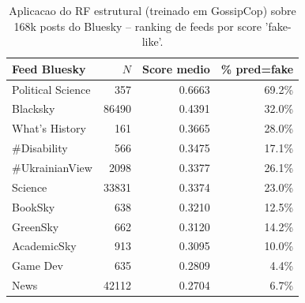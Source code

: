 \begin{table}[H]\centering
\caption{Aplicacao do RF estrutural (treinado em GossipCop) sobre 168k posts do Bluesky -- ranking de feeds por score 'fake-like'.}
\label{tab:bluesky_inferencia_feeds}
\begin{tabular}{lrrr}
\toprule
Feed Bluesky & $N$ & Score medio & \% pred=fake \\
\midrule
Political Science & 357 & 0.6663 & 69.2\% \\
Blacksky & 86490 & 0.4391 & 32.0\% \\
What's History & 161 & 0.3665 & 28.0\% \\
\#Disability & 566 & 0.3475 & 17.1\% \\
\#UkrainianView & 2098 & 0.3377 & 26.1\% \\
Science & 33831 & 0.3374 & 23.0\% \\
BookSky & 638 & 0.3210 & 12.5\% \\
GreenSky & 662 & 0.3120 & 14.2\% \\
AcademicSky & 913 & 0.3095 & 10.0\% \\
Game Dev & 635 & 0.2809 & 4.4\% \\
News & 42112 & 0.2704 & 6.7\% \\
\bottomrule
\end{tabular}
\end{table}